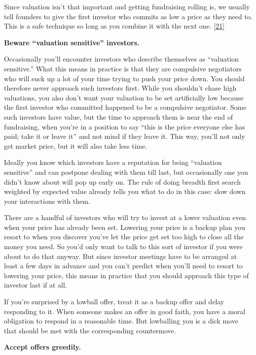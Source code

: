 Since valuation isn't that important and getting fundraising rolling is,
we usually tell founders to give the first investor who commits as low a
price as they need to. This is a safe technique so long as you combine
it with the next one. {[}\hyperref[f21n]{21}{]}

\textbf{Beware ``valuation sensitive'' investors.}

Occasionally you'll encounter investors who describe themselves as
``valuation sensitive.'' What this means in practice is that they are
compulsive negotiators who will suck up a lot of your time trying to
push your price down. You should therefore never approach such investors
first. While you shouldn't chase high valuations, you also don't want
your valuation to be set artificially low because the first investor who
committed happened to be a compulsive negotiator. Some such investors
have value, but the time to approach them is near the end of
fundraising, when you're in a position to say ``this is the price
everyone else has paid; take it or leave it'' and not mind if they leave
it. This way, you'll not only get market price, but it will also take
less time.

Ideally you know which investors have a reputation for being ``valuation
sensitive'' and can postpone dealing with them till last, but
occasionally one you didn't know about will pop up early on. The rule of
doing breadth first search weighted by expected value already tells you
what to do in this case: slow down your interactions with them.

There are a handful of investors who will try to invest at a lower
valuation even when your price has already been set. Lowering your price
is a backup plan you resort to when you discover you've let the price
get set too high to close all the money you need. So you'd only want to
talk to this sort of investor if you were about to do that anyway. But
since investor meetings have to be arranged at least a few days in
advance and you can't predict when you'll need to resort to lowering
your price, this means in practice that you should approach this type of
investor last if at all.

If you're surprised by a lowball offer, treat it as a backup offer and
delay responding to it. When someone makes an offer in good faith, you
have a moral obligation to respond in a reasonable time. But lowballing
you is a dick move that should be met with the corresponding
countermove.

\textbf{Accept offers greedily.}

